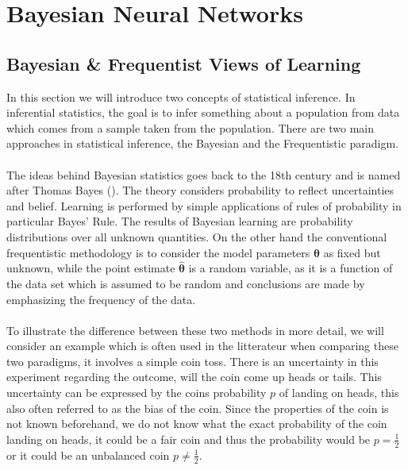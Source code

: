 \chapter{Bayesian Neural Networks}


\section{Bayesian \& Frequentist Views of Learning}\label{sec:bayesian_stat}
In this section we will introduce two concepts of statistical inference. In inferential statistics, the goal is to infer something about a population from data which comes from a sample taken from the population. There are two main approaches in statistical inference, the Bayesian and the Frequentistic paradigm.\\ 
\\
The ideas behind Bayesian statistics goes back to the 18th century and is named after Thomas Bayes (\cite{stigler1986history}). The theory considers probability to reflect uncertainties and belief. Learning is performed by simple applications of rules of probability in particular Bayes' Rule. The results of Bayesian learning are probability distributions over all unknown quantities. On the other hand the conventional frequentistic methodology is to consider the model parameters $\boldsymbol{\theta}$ as fixed but unknown, while the point estimate $\hat{\boldsymbol{\theta}}$ is a random variable, as it is a function of the data set which is assumed to be random and conclusions are made by emphasizing the frequency of the data.
\\
\\
To illustrate the difference between these two methods in more detail, we will consider an example which is often used in the litterateur when comparing these two paradigms, it involves a simple coin toss. There is an uncertainty in this experiment regarding the outcome, will the coin come up heads or tails. This uncertainty can be expressed by the coins probability $p$ of landing on heads, this also often referred to as the bias of the coin. Since the properties of the coin is not known beforehand, we do not know what the exact probability of the coin landing on heads, it could be a fair coin and thus the probability would be $p=\frac{1}{2}$ or it could be an unbalanced coin $p\neq \frac{1}{2}$.\\
\\
